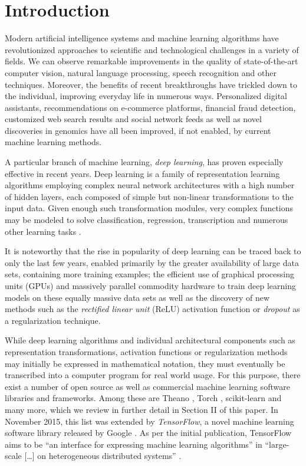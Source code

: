 \section{Introduction}

Modern artificial intelligence systems and machine learning algorithms have
revolutionized approaches to scientific and technological challenges in a
variety of fields. We can observe remarkable improvements in the quality of
state-of-the-art computer vision, natural language processing, speech
recognition and other techniques. Moreover, the benefits of recent breakthroughs
have trickled down to the individual, improving everyday life in numerous
ways. Personalized digital assistants, recommendations on e-commerce platforms,
financial fraud detection, customized web search results and social network
feeds as well as novel discoveries in genomics have all been improved, if not
enabled, by current machine learning methods.

A particular branch of machine learning, \emph{deep learning}, has proven
especially effective in recent years. Deep learning is a family of
representation learning algorithms employing complex neural network
architectures with a high number of hidden layers, each composed of simple but
non-linear transformations to the input data. Given enough such transformation
modules, very complex functions may be modeled to solve classification,
regression, transcription and numerous other learning tasks \cite{nature2015}.

It is noteworthy that the rise in popularity of deep learning can be traced back
to only the last few years, enabled primarily by the greater availability of
large data sets, containing more training examples; the efficient use of
graphical processing units (GPUs) and massively parallel commodity hardware to
train deep learning models on these equally massive data sets as well as the
discovery of new methods such as the \emph{rectified linear unit} (ReLU)
activation function or \emph{dropout} as a regularization technique\cite{relu,
  dropout, nature2015, rampasek}.

While deep learning algorithms and individual architectural components such as
representation transformations, activation functions or regularization methods
may initially be expressed in mathematical notation, they must eventually be
transcribed into a computer program for real world usage. For this purpose,
there exist a number of open source as well as commercial machine learning
software libraries and frameworks. Among these are Theano \cite{theano}, Torch
\cite{torch}, scikit-learn \cite{scikit} and many more, which we review in
further detail in Section II of this paper. In November 2015, this list was
extended by \emph{TensorFlow}, a novel machine learning software library
released by Google \cite{tensorflow}. As per the initial publication, TensorFlow
aims to be ``an interface for expressing machine learning algorithms'' in
``large-scale [\dots] on heterogeneous distributed systems'' \cite{tensorflow}.

